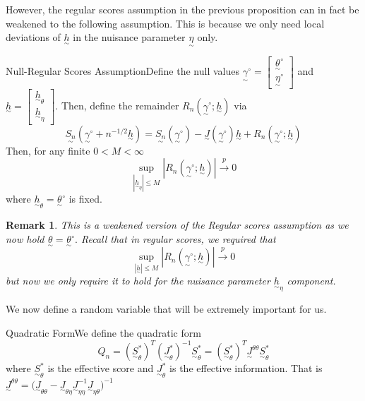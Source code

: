 \documentclass[twoside]{article}
\newtheorem{remark}[theorem]{Remark}
\newcommand{\utilde}{\underset{\sim}}
\begin{document}
\newpage
However, the regular scores assumption in the previous proposition can in fact be weakened to the following assumption. This is because we only need local deviations of $\utilde{h}$ in the nuisance parameter $\utilde{\eta}$ only.

\begin{definition_exam}{Null-Regular Scores Assumption}{}Define the null values $\utilde{\gamma}^{\circ} = \begin{bmatrix}\utilde{\theta}^{\circ}\\ \utilde{\eta}^{\circ}\end{bmatrix}$ and $\utilde{h} = \begin{bmatrix}\utilde{h}_{\theta}\\\utilde{h}_{\eta} \end{bmatrix}.$ Then, define the remainder $R_n(\utilde{\gamma}^{\circ};\utilde{h})$ via 
$$
\utilde{S_n}(\utilde{\gamma}^{\circ} + n^{-1/2}\utilde{h}) = \utilde{S_n}(\utilde{\gamma}^{\circ}) - \utilde{J}(\utilde{\gamma}^{\circ})\utilde{h} + R_n(\utilde{\gamma}^{\circ};\utilde{h})
$$
Then, for any finite $0 < M < \infty$
$$
\sup_{|\utilde{h}_{\eta}| \leq M}|R_n(\utilde{\gamma}^{\circ};\utilde{h})| \xrightarrow{p} 0
$$
where $\utilde{h}_{\theta} = \utilde{\theta}^{\circ}$ is fixed.
\end{definition_exam}

\begin{remark}This is a weakened version of the Regular scores assumption as we now hold $\utilde{\theta} = \utilde{\theta}^{\circ}.$ Recall that in regular scores, we required that 
$$
\sup_{|\utilde{h}| \leq M}|R_n(\utilde{\gamma}^{\circ};\utilde{h})| \xrightarrow{p} 0
$$
but now we only require it to hold for the nuisance parameter $\utilde{h}_{\eta}$ component.
\end{remark}

We now define a random variable that will be extremely important for us.
\begin{definition_exam}{Quadratic Form}{}We define the quadratic form 
$$
Q_n = (\utilde{S}_{\theta}^{*})^T(\utilde{J}_{\theta}^{*})^{-1}\utilde{S}_{\theta}^{*} = (\utilde{S}_{\theta}^{*})^T\utilde{J}^{\theta \theta}\utilde{S}_{\theta}^{*} 
$$
where $\utilde{S}_{\theta}^{*}$ is the effective score and $\utilde{J}_{\theta}^{*}$ is the effective information. That is $
\utilde{J}^{\theta \theta} = \bigg(\utilde{J}_{\theta \theta} - \utilde{J}_{\theta \eta}\utilde{J}_{\eta \eta}^{-1}\utilde{J}_{\eta \theta} \bigg)^{-1}
$
\end{definition_exam}
\end{document}
